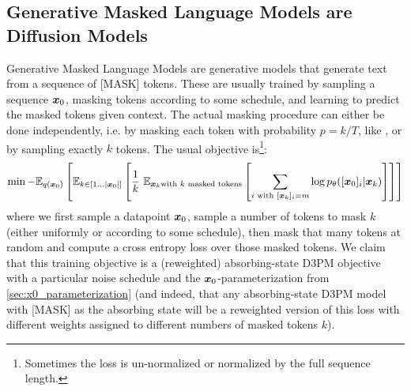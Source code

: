 \subsection{Generative Masked Language Models are Diffusion Models}

\label{appendix:cmlm}

Generative Masked Language Models \citep{mask_predict, bert_speak} are generative models that generate text from a sequence of [MASK] tokens. These are usually trained by sampling a sequence $\boldsymbol{x}_0$, masking tokens according to some schedule, and learning to predict the masked tokens given context. The actual masking procedure can either be done independently, i.e. by masking each token with probability $p = k/T$, like \citet{bert}, or by sampling exactly $k$ tokens. The usual objective is\footnote{Sometimes the loss is un-normalized or normalized by the full sequence length.}:
\begin{equation}
\label{eq:cmlm}
\min - \mathbb{E}_{q(\bx_0)}\left[\mathbb{E}_{k\in[1...|\bx_0|]}\left[\frac{1}{k}\ \mathbb{E}_{\bx_k \text{with $k$ masked tokens}}\left[\sum_{i \text{ with } [\bx_k]_i = m} \log p_\theta([\bx_0]_i | \bx_k)\right]\right]\right]
\end{equation}
where we first sample a datapoint $\boldsymbol{x}_0$, sample a number of tokens to mask $k$ (either uniformly or according to some schedule), then mask that many tokens at random and compute a cross entropy loss over those masked tokens. We claim that this training objective is a (reweighted) absorbing-state D3PM objective with a particular noise schedule and the $\boldsymbol{x}_0$-parameterization from \ref{sec:x0_parameterization} (and indeed, that any absorbing-state D3PM model with [MASK] as the absorbing state will be a reweighted version of this loss with different weights assigned to different numbers of masked tokens $k$).

